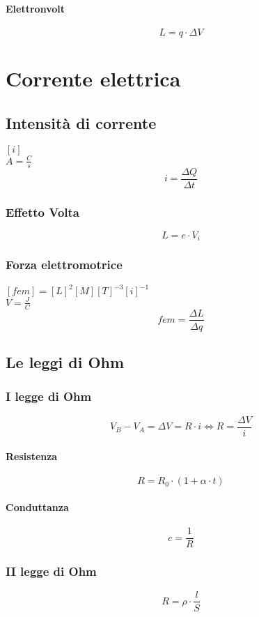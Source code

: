 \documentclass[a4paper,12pt]{article}
\theoremstyle{mystyle}
\begin{document}
\paragraph{Elettronvolt}
\[L =q \cdot \Delta V\]

\newpage


\section{Corrente elettrica}
\subsection{Intensità di corrente}
\([i]\)\\
\(A= \frac{C}{s}\)\\
\[i = \frac{\Delta Q}{\Delta t}\]

\subsubsection{Effetto Volta}
\[L = e \cdot V_i\]
\subsubsection{Forza elettromotrice}
\([fem]=[L]^2[M][T]^{-3}[i]^{-1}\)\\
\(V= \frac{J}{C}\)\\
\[fem = \frac{\Delta L}{\Delta q}\]

\newpage


\subsection{Le leggi di Ohm}
\subsubsection{I legge di Ohm}
\[V_B-V_A = \Delta V = R \cdot i \Leftrightarrow R = \frac{\Delta V}{i}\]
\paragraph{Resistenza}
\[R = R_0 \cdot(1 + \alpha \cdot t)\]
\paragraph{Conduttanza}
\[c = \frac{1}{R}\]
\subsubsection{II legge di Ohm}
\[R = \rho \cdot \frac{l}{S}\]
\end{document}
